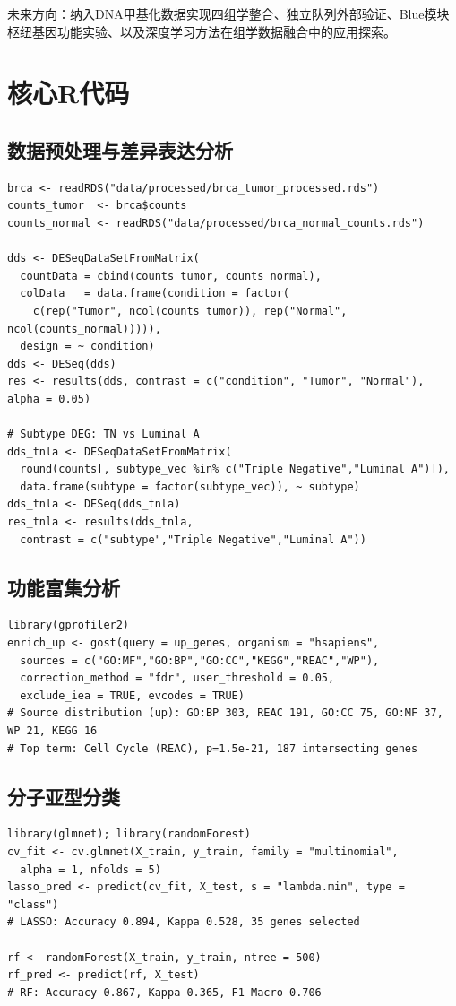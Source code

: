 \documentclass[12pt,a4paper]{ctexart}
\begin{document}
未来方向：纳入DNA甲基化数据实现四组学整合、独立队列外部验证、Blue模块枢纽基因功能实验、以及深度学习方法在组学数据融合中的应用探索。

\printbibliography

\newpage
\appendix
\section{核心R代码}

\subsection{数据预处理与差异表达分析}
\begin{lstlisting}[caption={mRNA预处理与DESeq2差异表达}, basicstyle=\ttfamily\scriptsize]
brca <- readRDS("data/processed/brca_tumor_processed.rds")
counts_tumor  <- brca$counts
counts_normal <- readRDS("data/processed/brca_normal_counts.rds")

dds <- DESeqDataSetFromMatrix(
  countData = cbind(counts_tumor, counts_normal),
  colData   = data.frame(condition = factor(
    c(rep("Tumor", ncol(counts_tumor)), rep("Normal", ncol(counts_normal))))),
  design = ~ condition)
dds <- DESeq(dds)
res <- results(dds, contrast = c("condition", "Tumor", "Normal"), alpha = 0.05)

# Subtype DEG: TN vs Luminal A
dds_tnla <- DESeqDataSetFromMatrix(
  round(counts[, subtype_vec %in% c("Triple Negative","Luminal A")]),
  data.frame(subtype = factor(subtype_vec)), ~ subtype)
dds_tnla <- DESeq(dds_tnla)
res_tnla <- results(dds_tnla,
  contrast = c("subtype","Triple Negative","Luminal A"))
\end{lstlisting}

\subsection{功能富集分析}
\begin{lstlisting}[caption={g:Profiler功能富集}, basicstyle=\ttfamily\scriptsize]
library(gprofiler2)
enrich_up <- gost(query = up_genes, organism = "hsapiens",
  sources = c("GO:MF","GO:BP","GO:CC","KEGG","REAC","WP"),
  correction_method = "fdr", user_threshold = 0.05,
  exclude_iea = TRUE, evcodes = TRUE)
# Source distribution (up): GO:BP 303, REAC 191, GO:CC 75, GO:MF 37, WP 21, KEGG 16
# Top term: Cell Cycle (REAC), p=1.5e-21, 187 intersecting genes
\end{lstlisting}

\subsection{分子亚型分类}
\begin{lstlisting}[caption={LASSO与随机森林分类}, basicstyle=\ttfamily\scriptsize]
library(glmnet); library(randomForest)
cv_fit <- cv.glmnet(X_train, y_train, family = "multinomial",
  alpha = 1, nfolds = 5)
lasso_pred <- predict(cv_fit, X_test, s = "lambda.min", type = "class")
# LASSO: Accuracy 0.894, Kappa 0.528, 35 genes selected

rf <- randomForest(X_train, y_train, ntree = 500)
rf_pred <- predict(rf, X_test)
# RF: Accuracy 0.867, Kappa 0.365, F1 Macro 0.706
\end{lstlisting}
\end{document}
